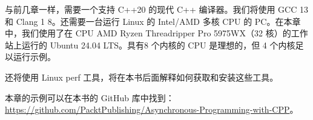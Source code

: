 与前几章一样，需要一个支持 C++20 的现代 C++ 编译器。我们将使用 GCC 13 和 Clang 1 8。还需要一台运行 Linux 的 Intel/AMD 多核 CPU 的 PC。在本章中，我们使用了在 CPU AMD Ryzen Threadripper Pro 5975WX（32 核）的工作站上运行的 Ubuntu 24.04 LTS。具有8 个内核的 CPU 是理想的，但 4 个内核足以运行示例。

还将使用 Linux perf 工具，将在本书后面解释如何获取和安装这些工具。

本章的示例可以在本书的 GitHub 库中找到： \url{https://github.com/PacktPublishing/Asynchronous-Programming-with-CPP}。